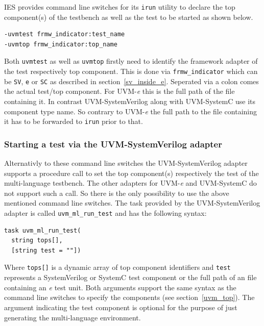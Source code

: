 IES provides command line switches for its \lstinline$irun$ utility to declare the top component(s) of the testbench as
well as the test to be started as shown below.
\medskip
{}
\begin{lstlisting}
-uvmtest frmw_indicator:test_name
-uvmtop frmw_indicator:top_name
\end{lstlisting} 
\medskip
Both \lstinline$uvmtest$ as well as \lstinline$uvmtop$ firstly need to identify the framework adapter of the test
respectively top component. This is done via \lstinline$frmw_indicator$ which can be \lstinline$SV$, \lstinline$e$ or
\lstinline$SC$ as described in section~\ref{sv_inside_e}. Seperated via a colon comes the actual test/top component. For
UVM-\textit{e} this is the full path of the file containing it. In contrast UVM-SystemVerilog along with UVM-SystemC use
its component type name. So contrary to UVM-\textit{e} the full path to the file containing it has to be forwarded to
\lstinline$irun$ prior to that.

\subsubsection{Starting a test via the UVM-SystemVerilog adapter}

Alternativly to these command line switches the UVM-SystemVerilog adapter supports a procedure call to set the top
component(s) respectively the test of the multi-language testbench. The other adapters for UVM-\textit{e} and
UVM-SystemC do not support such a call. So there is the only possibility to use the above mentioned command line
switches. The task provided by the UVM-SystemVerilog adapter is called \lstinline$uvm_ml_run_test$ and has the following
syntax:
\medskip
{}
\begin{lstlisting}
task uvm_ml_run_test(
  string tops[],
  [string test = ""])
\end{lstlisting} 
\medskip
Where \lstinline$tops[]$ is a dynamic array of top component identifiers and \lstinline$test$ represents a
SystemVerilog or SystemC test component or the full path of an file containing an \textit{e} test unit. Both arguments
support the same syntax as the command line switches to specify the components (see section~\ref{uvm_top}). The argument
indicating the test component is optional for the purpose of just generating the multi-language environment.